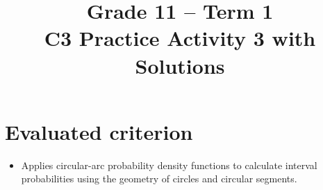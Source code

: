\makeatletter
{}
\makeatother




\newcommand{\CThreeWrappedGraph}[9]{%
	\begin{center}
		\begin{tikzpicture}
			\pgfmathsetmacro{\cycleA}{#2}
			\pgfmathsetmacro{\cycleB}{#3}
			\pgfmathsetmacro{\cyclePad}{0.06*(\cycleB-\cycleA)}
			\begin{axis}[
				width=9cm,
				height=5cm,
				axis lines=left,
				xlabel={$#1$},
				ylabel={$f(#1)$},
				xmin={\cycleA-\cyclePad},
				xmax={\cycleB+\cyclePad},
				ymin=0,
				ymax=#9,
				grid=both,
				samples=240
				]
				\addplot[domain=#2:#3,draw=none,fill=blue!20,fill opacity=0.35]
				{#4}\closedcycle;
				\addplot[domain=#5:#6,draw=none,fill=blue!65,fill opacity=0.60]
				{#4}\closedcycle;
				\addplot[domain=#7:#8,draw=none,fill=blue!65,fill opacity=0.60]
				{#4}\closedcycle;
				\addplot[domain=#2:#3,very thick,blue] {#4};
			\end{axis}
		\end{tikzpicture}
	\end{center}%
}


\title{Grade 11 -- Term 1 \\ C3 Practice Activity 3 with Solutions}
\author{}
\date{}


	\maketitle
	\setcounter{tocdepth}{1}
	\setcounter{secnumdepth}{2}
	\label{toc}
	\tableofcontents
	
	\section*{Evaluated criterion}
	\begin{itemize}
		\item [\textbf{C3.}] Applies circular-arc probability density functions to calculate interval probabilities using the geometry of circles and circular segments.
	\end{itemize}
	
